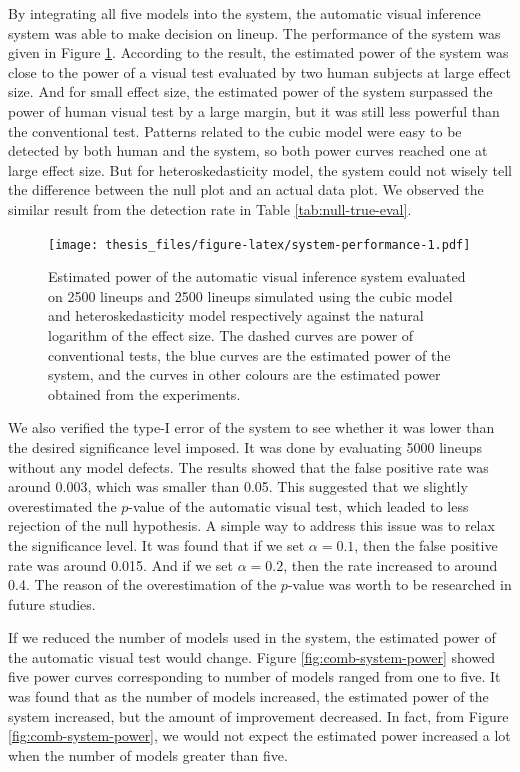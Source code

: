 \documentclass{monashthesis}
\theoremstyle{definition}
\theoremstyle{definition}
\theoremstyle{definition}
\theoremstyle{definition}
\theoremstyle{remark}
\begin{document}
By integrating all five models into the system, the automatic visual inference system was able to make decision on lineup. The performance of the system was given in Figure \ref{fig:system-performance}. According to the result, the estimated power of the system was close to the power of a visual test evaluated by two human subjects at large effect size. And for small effect size, the estimated power of the system surpassed the power of human visual test by a large margin, but it was still less powerful than the conventional test. Patterns related to the cubic model were easy to be detected by both human and the system, so both power curves reached one at large effect size. But for heteroskedasticity model, the system could not wisely tell the difference between the null plot and an actual data plot. We observed the similar result from the detection rate in Table \ref{tab:null-true-eval}.

\begin{figure}
\centering
\texttt{[image: thesis\_files/figure-latex/system-performance-1.pdf]}
\caption{\label{fig:system-performance}Estimated power of the automatic visual inference system evaluated on 2500 lineups and 2500 lineups simulated using the cubic model and heteroskedasticity model respectively against the natural logarithm of the effect size. The dashed curves are power of conventional tests, the blue curves are the estimated power of the system, and the curves in other colours are the estimated power obtained from the experiments.}
\end{figure}

We also verified the type-I error of the system to see whether it was lower than the desired significance level imposed. It was done by evaluating 5000 lineups without any model defects. The results showed that the false positive rate was around \(0.003\), which was smaller than 0.05. This suggested that we slightly overestimated the \(p\)-value of the automatic visual test, which leaded to less rejection of the null hypothesis. A simple way to address this issue was to relax the significance level. It was found that if we set \(\alpha = 0.1\), then the false positive rate was around 0.015. And if we set \(\alpha = 0.2\), then the rate increased to around 0.4. The reason of the overestimation of the \(p\)-value was worth to be researched in future studies.

If we reduced the number of models used in the system, the estimated power of the automatic visual test would change. Figure \ref{fig:comb-system-power} showed five power curves corresponding to number of models ranged from one to five. It was found that as the number of models increased, the estimated power of the system increased, but the amount of improvement decreased. In fact, from Figure \ref{fig:comb-system-power}, we would not expect the estimated power increased a lot when the number of models greater than five.
\end{document}
